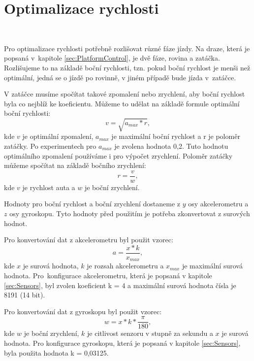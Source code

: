 \chapter{Optimalizace rychlosti}
\label{sec:SpeedOptimization}
\vspace{-20pt}
\

Pro optimalizace rychlosti potřebně rozlišovat různé fáze jízdy.
Na draze, která je popsaná v~kapitole \ref{sec:PlatformControl},
je dvě fáze, rovina a zatáčka. Rozlišujeme to na základě
boční rychlosti, tzn. pokud boční rychlost je menši než optimální, jedná se o 
jízdě po rovinně, v jiném případě bude jízda v~zatáčce.

V zatáčce musíme spočítat takové zpomalení nebo zrychlení, aby boční rychlost byla co nejblíž
ke koeficientu. Můžeme to udělat na základě formule optimální boční rychlosti:
\begin{equation}
v = \sqrt{a_{max} * r},
\end{equation}
kde $v$ je optimální zpomalení, $a_{max}$ je maximální boční rychlost a r je
poloměr zatáčky. Po experimentech pro $a_{max}$ je zvolena hodnota 0,2. 
Tuto hodnotu optimálního zpomalení používáme i pro výpočet zrychlení. 
Poloměr zatáčky můžeme spočítat na základě bočního zrychlení:
\begin{equation}
r = \frac{v}{w},
\end{equation}
kde $v$ je rychlost auta a $w$ je boční zrychlení.

Hodnoty pro boční rychlost a boční zrychlení dostaneme z $y$ osy akcelerometru
a $z$ osy gyroskopu. Tyto hodnoty před použitím je potřeba zkonvertovat z 
surových hodnot. 

Pro konvertování dat z akcelerometru byl použit vzorec:
\begin{equation}
a = \frac{x * k}{x_{max}},
\end{equation}
kde $x$ je surová hodnota, $k$ je rozsah akcelerometru a $x_{max}$ je maximální surová 
hodnota. Pro~konfigurace akcelerometru, která je popsaná v kapitole \ref{sec:Sensors},
byl zvolen koeficient k = 4 a maximální surová hodnota čísla je 8191 (14 bit).

Pro konvertování dat z gyroskopu byl použit vzorec:
\begin{equation}
w = x * k * \frac{\pi}{180},
\end{equation} 
kde $w$ je boční zrychlení, $k$ je citlivost senzoru v stupně za sekundu a $x$
je surová hodnota. Pro konfigurace gyroskopu, která je popsaná 
v kapitole \ref{sec:Sensors}, byla použita hodnota  k = 0,03125.

\endinput
